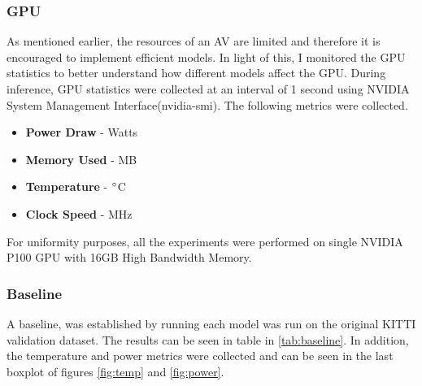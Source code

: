 \subsubsection*{GPU}
As mentioned earlier, the resources of an AV are limited and therefore it is encouraged to implement efficient models. In light of this, I monitored the GPU statistics to better understand how different models affect the GPU. 
During inference, GPU statistics were collected at an interval of 1 second using NVIDIA System Management Interface(nvidia-smi). The following metrics were collected. 
\begin{itemize}[noitemsep]
	\item \textbf{Power Draw } - Watts
	\item \textbf{Memory Used } - MB
	\item \textbf{Temperature} - $\degree$C
	\item \textbf{Clock Speed} - MHz
\end{itemize}
For uniformity purposes, all the experiments were performed on single NVIDIA P100 GPU with 16GB High Bandwidth Memory. 
\subsubsection*{Baseline}
 A baseline, was established by running each model was run on the original KITTI validation dataset. The results can be seen in table  in \ref{tab:baseline}. In addition, the temperature and power metrics were collected and can be seen in the last boxplot of figures \ref{fig:temp} and \ref{fig:power}.


